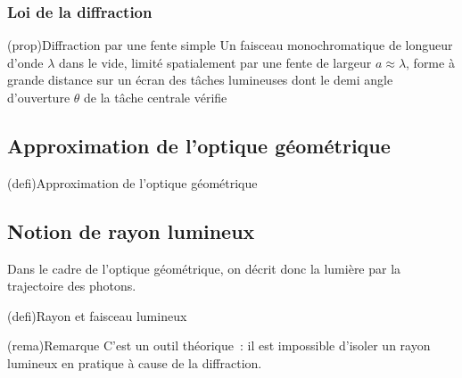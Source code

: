 \documentclass[../../main/main.tex]{subfiles}
\begin{document}
\subsubsection{Loi de la diffraction}

\begin{tcb}[label=prop:loidiff](prop){Diffraction par une fente simple}
	Un faisceau monochromatique de longueur d'onde $\lambda$ dans le vide,
	limité spatialement par une fente de largeur $a \approx \lambda$, forme à
	grande distance sur un écran des tâches lumineuses dont le demi angle
	d'ouverture $\theta$ de la tâche centrale vérifie
	\psw{
		\[
			\boxed{\sin(\theta) = \frac{\lambda}{a}}
		\]
	}
	\vspace*{-10pt}
\end{tcb}

\subsection{Approximation de l'optique géométrique}

\begin{tcb}[label=def:optgeo](defi){Approximation de l'optique géométrique}
\end{tcb}

\subsection{Notion de rayon lumineux}

Dans le cadre de l'optique géométrique, on décrit donc la lumière par la
trajectoire des photons.

\begin{tcb}[cnt, bld, label=def:rl](defi){Rayon et faisceau lumineux}
\end{tcb}
\begin{tcb}(rema){Remarque}
	C'est un outil théorique~: il est impossible d'isoler un rayon lumineux
	en pratique à cause de la diffraction.
\end{tcb}
\end{document}
